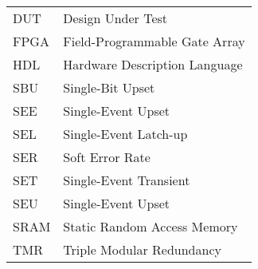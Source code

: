 \begin{listofabbr}[3cm]
\begin{longtable}{lp{5in}}

DUT & Design Under Test \\

FPGA & Field-Programmable Gate Array \\
HDL &Hardware Description Language \\


SBU &Single-Bit Upset \\
SEE &Single-Event Upset \\
SEL &Single-Event Latch-up \\
SER &Soft Error Rate \\
SET &Single-Event Transient \\
SEU &Single-Event Upset \\
SRAM &Static Random Access Memory \\
TMR &Triple Modular Redundancy \\

\end{longtable}
\end{listofabbr}